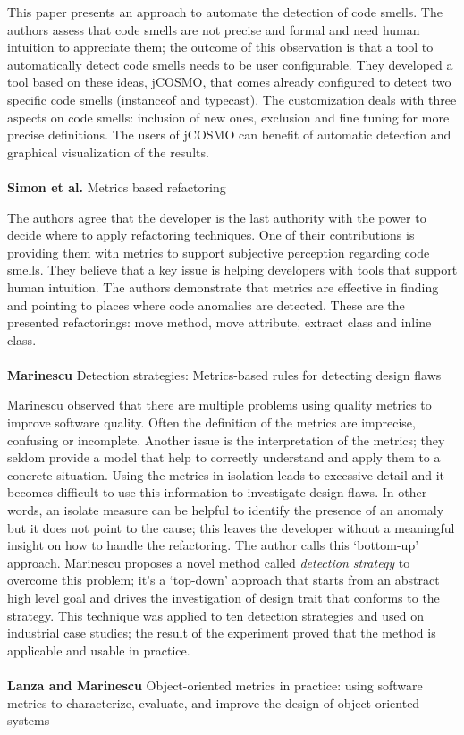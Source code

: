 This paper presents an approach to automate the detection of code smells. The authors assess that code smells are not precise and formal and need human intuition to appreciate them; the outcome of this observation is that a tool to automatically detect code smells needs to be user configurable.
They developed a tool based on these ideas, jCOSMO, that comes already configured to detect two specific code smells (instanceof and typecast). The customization deals with three aspects on code smells: inclusion of new ones, exclusion and fine tuning for more precise definitions.
The users of jCOSMO can benefit of automatic detection and graphical visualization of the results.
\\
\\
\textbf{Simon et al.} \cite{simon2001metrics} Metrics based refactoring

The authors agree that the developer is the last authority with the power to decide where to apply refactoring techniques. One of their contributions is providing them with metrics to support subjective perception regarding code smells. They believe that a key issue is helping developers with tools that support human intuition. 
The authors demonstrate that metrics are effective in finding and pointing to places where code anomalies are detected. These are the presented refactorings: move method, move attribute, extract class and inline class.
\\
\\
\textbf{Marinescu} \cite{marinescu2004detection} Detection strategies: Metrics-based rules for detecting design flaws

Marinescu observed that there are multiple problems using quality metrics to improve software quality. Often the definition of the metrics are imprecise, confusing or incomplete. Another issue is the interpretation of the metrics; they seldom provide a model that help to correctly understand and apply them to a concrete situation. 
Using the metrics in isolation leads to excessive detail and it becomes difficult to use this information to investigate design flaws. In other words, an isolate measure can be helpful to identify the presence of an anomaly but it does not point to the cause; this leaves the developer without a meaningful insight on how to handle the refactoring. The author calls this `bottom-up' approach.
Marinescu proposes a novel method called \emph{detection strategy} to overcome this problem; it's a `top-down' approach that starts from an abstract high level goal and drives the investigation of design trait that conforms to the strategy.
This technique was applied to ten detection strategies and used on industrial case studies; the result of the experiment proved that the method is applicable and usable in practice.
\\
\\
\textbf{Lanza and Marinescu} \cite{lanza2007object} Object-oriented metrics in practice: using software metrics to characterize, evaluate, and improve the design of object-oriented systems

